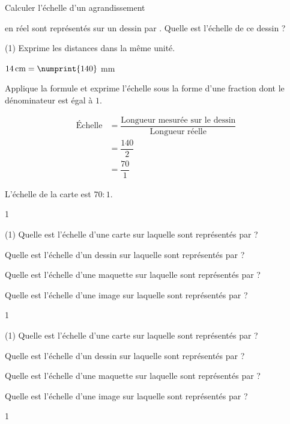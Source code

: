 \documentclass[a4paper,11pt]{report}
\begin{document}
\begin{resolu}{Calculer l'échelle d'un agrandissement}{
 en réel sont représentés sur un dessin par . Quelle est l'échelle de ce dessin ?

\begin{tasks}(1)
    \task Exprime les distances dans la même unité.

    $\tunit{14}{\centi m} = \numprint{140}$ mm

    \task Applique la formule et exprime l'échelle sous la forme d'une fraction dont le dénominateur est égal à $1$.
    
    \begin{align*}        \textrm{Échelle}&=\dfrac{\textrm{Longueur mesurée sur le dessin}}{\textrm{Longueur réelle}} \\
    &=\dfrac{140}{2} \\
    &=\dfrac{70}{1} 
    \end{align*}
    
    \task L'échelle de la carte est $70:1$.
\end{tasks}
}{1}    
\end{resolu}


\begin{exo}{
\begin{tasks}(1)
    \task Quelle est l'échelle d'une carte sur laquelle  sont représentés par  ?

    \task Quelle est l'échelle d'un dessin sur laquelle  sont représentés par  ?

    \task Quelle est l'échelle d'une maquette sur laquelle  sont représentés par  ?

    \task Quelle est l'échelle d'une image sur laquelle  sont représentés par  ?
\end{tasks}
}{1}    
\end{exo}

\begin{exo}{
\begin{tasks}(1)
    \task Quelle est l'échelle d'une carte sur laquelle  sont représentés par  ?

    \task Quelle est l'échelle d'un dessin sur laquelle  sont représentés par  ?

    \task Quelle est l'échelle d'une maquette sur laquelle  sont représentés par  ?

    \task Quelle est l'échelle d'une image sur laquelle  sont représentés par  ?
\end{tasks}
}{1}    
\end{exo}
\end{document}
